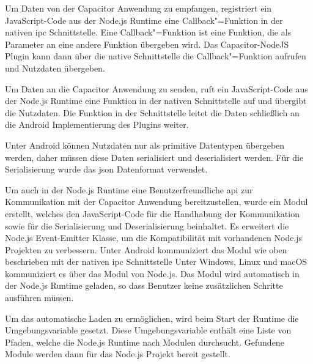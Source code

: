 \vspace{-1em}

Um Daten von der Capacitor Anwendung zu empfangen, registriert ein JavaScript-Code aus der Node.js Runtime eine Callback"=Funktion in der nativen \ac{ipc} Schnittstelle.
Eine Callback"=Funktion ist eine Funktion, die als Parameter an eine andere Funktion übergeben wird.
Das Capacitor-NodeJS Plugin kann dann über die native Schnittstelle die Callback"=Funktion aufrufen und Nutzdaten übergeben.

Um Daten an die Capacitor Anwendung zu senden, ruft ein JavaScript-Code aus der Node.js Runtime eine Funktion in der nativen Schnittstelle auf und übergibt die Nutzdaten.
Die Funktion in der Schnittstelle leitet die Daten schließlich an die Android Implementierung des Plugins weiter.

Unter Android können Nutzdaten nur als primitive Datentypen übergeben werden, daher müssen diese Daten serialisiert und deserialisiert werden.
Für die Serialisierung wurde das \ac{json} Datenformat verwendet.

Um auch in der Node.js Runtime eine Benutzerfreundliche \ac{api} zur Kommunikation mit der Capacitor Anwendung bereitzustellen, wurde ein  Modul erstellt, welches den JavaScript-Code für die Handhabung der Kommunikation sowie für die Serialisierung und Deserialisierung beinhaltet.
Es erweitert die Node.js Event-Emitter Klasse, um die Kompatibilität mit vorhandenen Node.js Projekten zu verbessern.
Unter Android kommuniziert das Modul wie oben beschrieben mit der nativen \ac{ipc} Schnittstelle
Unter Windows, Linux und macOS kommuniziert es über das  Modul von Node.js.
Das  Modul wird automatisch in der Node.js Runtime geladen, so dass Benutzer keine zusätzlichen Schritte ausführen müssen.

Um das automatische Laden zu ermöglichen, wird beim Start der Runtime die Umgebungsvariable  gesetzt.
Diese Umgebungsvariable enthält eine Liste von Pfaden, welche die Node.js Runtime nach Modulen durchsucht.
Gefundene Module werden dann für das Node.js Projekt bereit gestellt.
\cite{nodejs-mobile:docs, nodejs}
